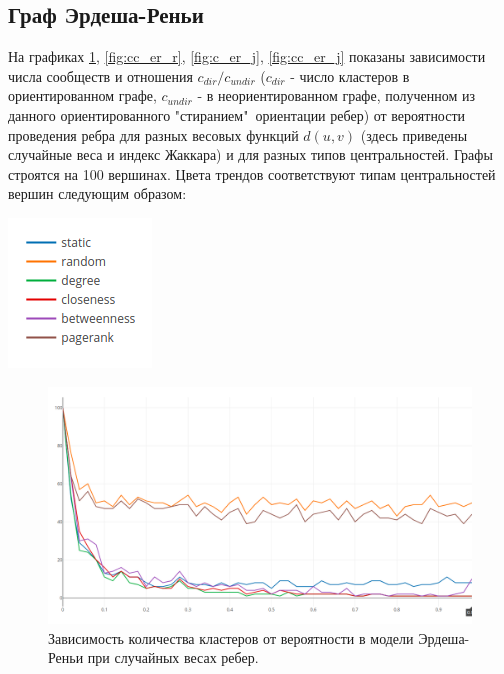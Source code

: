 \subsection{Граф Эрдеша-Реньи}
На графиках \ref{fig:c_er_r}, \ref{fig:cc_er_r}, \ref{fig:c_er_j}, \ref{fig:cc_er_j} показаны зависимости числа сообществ и отношения $c_{dir}/c_{undir}$ ($c_{dir}$ - число кластеров в ориентированном графе, $c_{undir}$ - в неориентированном графе, полученном из данного ориентированного "стиранием"\ ориентации ребер) от вероятности проведения ребра для разных весовых функций $d(u, v)$ (здесь приведены случайные веса и индекс Жаккара) и для разных типов центральностей. Графы строятся на 100 вершинах. Цвета трендов соответствуют типам центральностей вершин следующим образом:

\begin{center}
	\includegraphics[scale=0.78]{pics/colormap.png}
\end{center}

	\begin{figure}
		\centering
		\includegraphics[width=\textwidth]{pics/random_count.png}
		\caption{Зависимость количества кластеров от вероятности в модели Эрдеша-Реньи при случайных весах ребер.}
		\label{fig:c_er_r}
	\end{figure}
	
